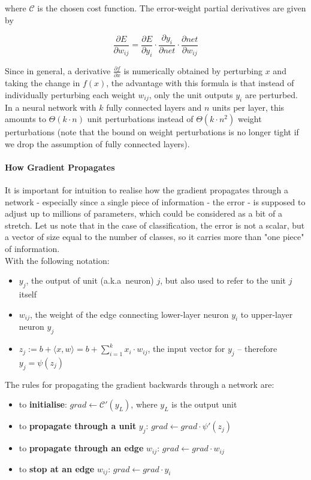 \documentclass[a4paper,11pt]{article}
\begin{document}
where $\mathcal{C}$ is the chosen cost function. The error-weight partial derivatives are given by

\begin{equation}
\frac{\partial{E}}{\partial{w_{ij}}} = \frac{\partial{E}}{\partial{y_{i}}} \cdot \frac{\partial{y_{i}}}{\partial{net}} \cdot \frac{\partial{net}}{\partial{w_{ij}}}
\end{equation}

Since in general, a derivative $\frac{\partial{f}}{\partial{x}}$ is numerically obtained by perturbing $x$ and taking the change in $f(x)$, the advantage with this formula is that instead of individually perturbing each weight $w_{ij}$, only the unit outputs $y_{i}$ are perturbed. In a neural network with $k$ fully connected layers and $n$ units per layer, this amounts to $\Theta(k \cdot n)$ unit perturbations instead of $\Theta(k \cdot n^{2})$ weight perturbations (note that the bound on weight perturbations is no longer tight if we drop the assumption of fully connected layers).

\paragraph{How Gradient Propagates}

It is important for intuition to realise how the gradient propagates through a network - especially since a single piece of information - the error - is supposed to adjust up to millions of parameters, which could be considered as a bit of a stretch. Let us note that in the case of classification, the error is not a scalar, but a vector of size equal to the number of classes, so it carries more than "one piece" of information. \\

With the following notation:
\begin{itemize}
\renewcommand\labelitemi{--}
\item $y_{j}$, the output of unit (a.k.a\ neuron) $j$, but also used to refer to the unit $j$ itself
\item $w_{ij}$, the weight of the edge connecting lower-layer neuron $y_{i}$ to upper-layer neuron $y_{j}$
\item $z_{j} := b+ \langle x,w \rangle = b + \sum\limits_{i=1}^k x_{i}\cdot w_{ij}$, the input vector for $y_{j}$ -- therefore $y_{j} = \psi(z_{j})$ \\
\end{itemize}

The rules for propagating the gradient backwards through a network are:
\begin{itemize}
\renewcommand\labelitemi{--}
\item to \textbf{initialise}: $grad \leftarrow \mathcal{C}'(y_{L})$, where $y_{L}$ is the output unit
\item to \textbf{propagate through a unit} $y_{j}$: $grad \leftarrow grad \cdot \psi'(z_{j})$
\item to \textbf{propagate through an edge} $w_{ij}$: $grad \leftarrow grad \cdot w_{ij}$
\item to \textbf{stop at an edge} $w_{ij}$: $grad \leftarrow grad \cdot y_{i}$ \\
\end{itemize}
\end{document}
